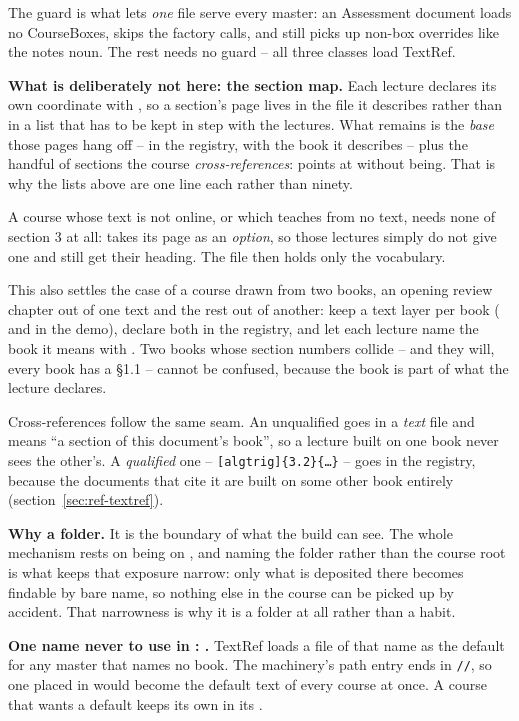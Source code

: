 The  guard is what lets \emph{one} file serve every master:
an Assessment document loads no CourseBoxes, skips the factory calls, and
still picks up non-box overrides like the notes noun. The rest needs no
guard -- all three classes load TextRef.

\textbf{What is deliberately not here: the section map.} Each lecture
declares its own coordinate with , so a section's page
lives in the file it describes rather than in a list that has to be kept
in step with the lectures. What remains is the \emph{base} those pages
hang off -- in the registry, with the book it describes -- plus the
handful of sections the course \emph{cross-references}: points at without
being. That is why the lists above are one line each rather than ninety.

A course whose text is not online, or which teaches from no text, needs
none of section 3 at all:  takes its page as an
\emph{option}, so those lectures simply do not give one and still get
their heading. The file then holds only the vocabulary.

This also settles the case of a course drawn from two books, an opening
review chapter out of one text and the rest out of another: keep a text
layer per book ( and  in the demo),
declare both in the registry, and let each lecture name the book it means
with . Two books whose section numbers collide -- and they
will, every book has a \S1.1 -- cannot be confused, because the book is
part of what the lecture declares.

Cross-references follow the same seam. An unqualified
 goes in a \emph{text} file and means ``a section of
this document's book'', so a lecture built on one book never sees the
other's. A \emph{qualified} one --
\texttt{[algtrig]\{3.2\}\{\dots\}} -- goes in the
registry, because the documents that cite it are built on some other book
entirely (section~\ref{sec:ref-textref}).

\textbf{Why a folder.} It is the boundary of what the build can see. The
whole mechanism rests on  being on
, and naming the folder rather than the course root is what
keeps that exposure narrow: only what is deposited there becomes findable
by bare name, so nothing else in the course can be picked up by accident.
That narrowness is why it is a folder at all rather than a habit.

\textbf{One name never to use in : .}
TextRef loads a file of that name as the default for any master that names no book.
The machinery's path entry ends in \texttt{//}, so one placed in  would become the default text of every course at once.
A course that wants a default keeps its own  in its .

